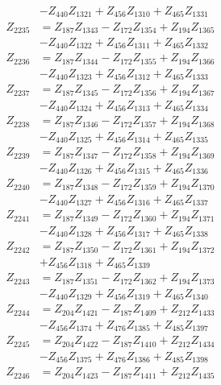 \begin{multicols}{2}
\begin{align}
&- Z_{440}Z_{1321} + Z_{456}Z_{1310} + Z_{465}Z_{1331} \nonumber \\
Z_{2235} &= Z_{187}Z_{1343} - Z_{172}Z_{1354} + Z_{194}Z_{1365}  \nonumber \\
&- Z_{440}Z_{1322} + Z_{456}Z_{1311} + Z_{465}Z_{1332} \nonumber \\
Z_{2236} &= Z_{187}Z_{1344} - Z_{172}Z_{1355} + Z_{194}Z_{1366}  \nonumber \\
&- Z_{440}Z_{1323} + Z_{456}Z_{1312} + Z_{465}Z_{1333} \nonumber \\
Z_{2237} &= Z_{187}Z_{1345} - Z_{172}Z_{1356} + Z_{194}Z_{1367}  \nonumber \\
&- Z_{440}Z_{1324} + Z_{456}Z_{1313} + Z_{465}Z_{1334} \nonumber \\
Z_{2238} &= Z_{187}Z_{1346} - Z_{172}Z_{1357} + Z_{194}Z_{1368}  \nonumber \\
&- Z_{440}Z_{1325} + Z_{456}Z_{1314} + Z_{465}Z_{1335} \nonumber \\
Z_{2239} &= Z_{187}Z_{1347} - Z_{172}Z_{1358} + Z_{194}Z_{1369}  \nonumber \\
&- Z_{440}Z_{1326} + Z_{456}Z_{1315} + Z_{465}Z_{1336} \nonumber \\
Z_{2240} &= Z_{187}Z_{1348} - Z_{172}Z_{1359} + Z_{194}Z_{1370}  \nonumber \\
&- Z_{440}Z_{1327} + Z_{456}Z_{1316} + Z_{465}Z_{1337} \nonumber \\
Z_{2241} &= Z_{187}Z_{1349} - Z_{172}Z_{1360} + Z_{194}Z_{1371}  \nonumber \\
&- Z_{440}Z_{1328} + Z_{456}Z_{1317} + Z_{465}Z_{1338} \nonumber \\
Z_{2242} &= Z_{187}Z_{1350} - Z_{172}Z_{1361} + Z_{194}Z_{1372}  \nonumber \\
&+ Z_{456}Z_{1318} + Z_{465}Z_{1339} \nonumber \\
Z_{2243} &= Z_{187}Z_{1351} - Z_{172}Z_{1362} + Z_{194}Z_{1373}  \nonumber \\
&- Z_{440}Z_{1329} + Z_{456}Z_{1319} + Z_{465}Z_{1340} \nonumber \\
Z_{2244} &= Z_{204}Z_{1421} - Z_{187}Z_{1409} + Z_{212}Z_{1433}  \nonumber \\
&- Z_{456}Z_{1374} + Z_{476}Z_{1385} + Z_{485}Z_{1397} \nonumber \\
Z_{2245} &= Z_{204}Z_{1422} - Z_{187}Z_{1410} + Z_{212}Z_{1434}  \nonumber \\
&- Z_{456}Z_{1375} + Z_{476}Z_{1386} + Z_{485}Z_{1398} \nonumber \\
Z_{2246} &= Z_{204}Z_{1423} - Z_{187}Z_{1411} + Z_{212}Z_{1435}  \nonumber \\

\end{align}
\end{multicols}
